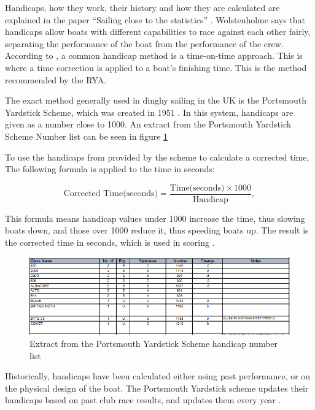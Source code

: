 \documentclass{l4proj}
\begin{document}
Handicaps, how they work, their history and how they are calculated are explained in the paper “Sailing close to the statistics” \citep{hanicaps}. Wolstenholme says that handicaps allow boats with different capabilities to race against each other fairly, separating the performance of the boat from the performance of the crew. 
According to \citet{hanicaps}, a common handicap method is a time-on-time approach. This is where a time correction is applied to a boat’s finishing time. This is the method recommended by the RYA.

The exact method generally used in dinghy sailing in the UK is the Portsmouth Yardstick Scheme, which was created in 1951 \citep{hanicaps}. In this system, handicaps are given as a number close to 1000. An extract from the Portsmouth Yardstick Scheme Number list \citep{RYApy} can be seen in figure \ref{fig:Hanicaps}

To use the handicaps from provided by the scheme to calculate a corrected time, The following formula is applied to the time in seconds:

\begin{equation}
    \text{Corrected Time(seconds)} = \frac{\text{Time(seconds)} \times 1000}{\text{Handicap}},
    \label{eq:1}
\end{equation}  

This formula means handicap values under 1000 increase the time, thus slowing boats down, and those over 1000 reduce it, thus speeding boats up. The result is the corrected time in seconds, which is used in scoring \citep{RYAscore}.

\begin{figure}[H]
    \centering
    \includegraphics[width=1\linewidth]{images/Handicaps.png} 

    \caption{Extract from the Portsmouth Yardstick Scheme handicap number list \citep{RYApy}
    }

    \label{fig:Hanicaps} 
\end{figure}

Historically, handicaps have been calculated either using past performance, or on the physical design of the boat. The Portsmouth Yardstick scheme updates their handicaps based on past club race results, and updates them every year \citep{hanicaps}.
\end{document}

